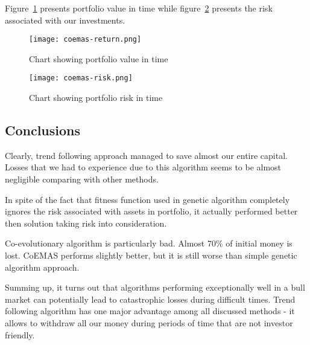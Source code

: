 Figure~\ref{fig:agent_2008_return} presents portfolio value in time while  figure~\ref{fig:agent_2008_risk} presents the risk associated with our investments.

\begin{figure}[ht]
  \begin{center}
    \texttt{[image: coemas-return.png]}
  \end{center}
  \caption{Chart showing portfolio value in time}
  \label{fig:agent_2008_return}
\end{figure}


\begin{figure}[ht]
  \begin{center}
    \texttt{[image: coemas-risk.png]}
  \end{center}
  \caption{Chart showing portfolio risk in time}
  \label{fig:agent_2008_risk}
\end{figure}

\subsection{Conclusions}

Clearly, trend following approach managed to save almost our entire capital.
Losses that we had to experience due to this algorithm seems to be almost negligible comparing with other methods.

In spite of the fact that fitness function used in genetic algorithm completely ignores the risk associated with assets in portfolio,       it actually performed better then solution taking risk into consideration.

Co-evolutionary algorithm is particularly bad. 
Almost 70\% of initial money is lost. CoEMAS performs slightly better, but it is still worse than simple genetic algorithm approach.

Summing up, it turns out that algorithms performing exceptionally well in a bull market can potentially lead to catastrophic losses during
difficult times. 
Trend following algorithm has one major advantage among all discussed methods - it allows to withdraw all our money during periods of time
that are not investor friendly.